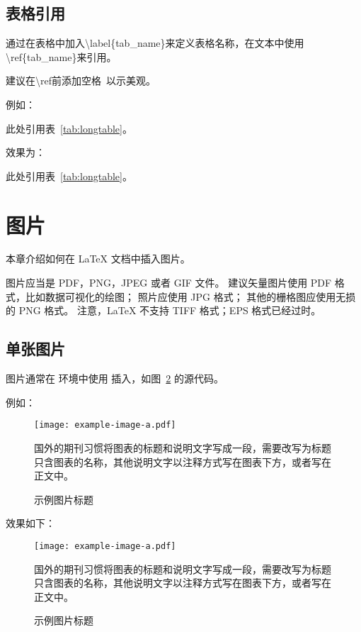 \subsection{表格引用}

通过在表格中加入\textbackslash label\{tab\_name\}来定义表格名称，在文本中使用\textbackslash ref\{tab\_name\}来引用。

建议在\textbackslash ref前添加空格~以示美观。

例如：

\begin{python}
此处引用表~\ref{tab:longtable}。
\end{python}

效果为：

此处引用表~\ref{tab:longtable}。

\section{图片}

本章介绍如何在 LaTeX 文档中插入图片。

图片应当是 PDF，PNG，JPEG 或者 GIF 文件。
建议矢量图片使用 PDF 格式，比如数据可视化的绘图；
照片应使用 JPG 格式；
其他的栅格图应使用无损的 PNG 格式。
注意，LaTeX 不支持 TIFF 格式；EPS 格式已经过时。

\subsection{单张图片}

图片通常在  环境中使用  插入，如图~\ref{fig:example} 的源代码。

例如：

\begin{python}
\begin{figure}
	\centering
	\texttt{[image: example-image-a.pdf]}
	\caption*{国外的期刊习惯将图表的标题和说明文字写成一段，需要改写为标题只含图表的名称，其他说明文字以注释方式写在图表下方，或者写在正文中。}
	\caption{示例图片标题}
	\label{fig:example}
\end{figure}
\end{python}

效果如下：

\begin{figure}
	\centering
	\texttt{[image: example-image-a.pdf]}
	\caption*{国外的期刊习惯将图表的标题和说明文字写成一段，需要改写为标题只含图表的名称，其他说明文字以注释方式写在图表下方，或者写在正文中。}
	\caption{示例图片标题}
	\label{fig:example}
\end{figure}

